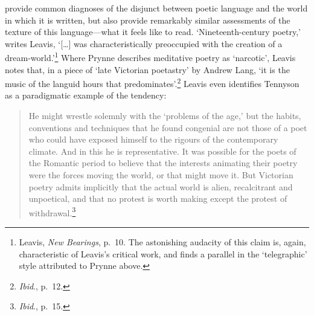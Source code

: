 \documentclass[]{article}
\begin{document}
provide common diagnoses of the disjunct between poetic language and the
world in which it is written, but also provide remarkably similar
assessments of the texture of this language---what it feels like to
read. `Nineteenth-century poetry,' writes Leavis, `{[}\ldots{}{]} was
characteristically preoccupied with the creation of a
dream-world.'\footnote{Leavis, \emph{New Bearings}, p.~10. The
  astonishing audacity of this claim is, again, characteristic of
  Leavis's critical work, and finds a parallel in the `telegraphic'
  style attributed to Prynne above.} Where Prynne describes meditative
poetry as `narcotic', Leavis notes that, in a piece of `late Victorian
poetastry' by Andrew Lang, `it is the music of the languid hours that
predominates'.\footnote{\emph{Ibid}., p.~12.} Leavis even identifies
Tennyson as a paradigmatic example of the tendency:

\begin{quote}
He might wrestle solemnly with the `problems of the age,' but the
habits, conventions and techniques that he found congenial are not those
of a poet who could have exposed himself to the rigours of the
contemporary climate. And in this he is representative. It was possible
for the poets of the Romantic period to believe that the interests
animating their poetry were the forces moving the world, or that might
move it. But Victorian poetry admits implicitly that the actual world is
alien, recalcitrant and unpoetical, and that no protest is worth making
except the protest of withdrawal.\footnote{\emph{Ibid}., p.~15.}
\end{quote}
\end{document}
